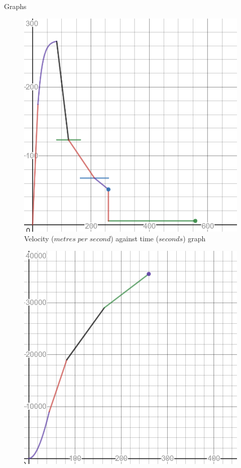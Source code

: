 \documentclass[final]{beamer}
\newlength{\onecolwid}
\newlength{\twocolwid}
\begin{document}
\begin{frame}
\begin{columns}[t]
\begin{column}{\twocolwid}
\begin{columns}[t,totalwidth=\twocolwid]
\begin{column}{\onecolwid}
\begin{exampleblock}{Graphs}
\begin{figure}
    \centering
    \includegraphics[width=1.0\linewidth]{img/velocity_graph.png}
    \caption{Velocity ($metres\;per\;second$) against time ($seconds$) graph}
    \label{fig:velocity}
\end{figure}
\begin{figure}
    \centering
    \includegraphics[width=1.0\linewidth]{img/displacement_graph.png}

\end{figure}
\end{exampleblock}
\end{column}
\end{columns}
\end{column}
\end{columns}
\end{frame}
\end{document}
